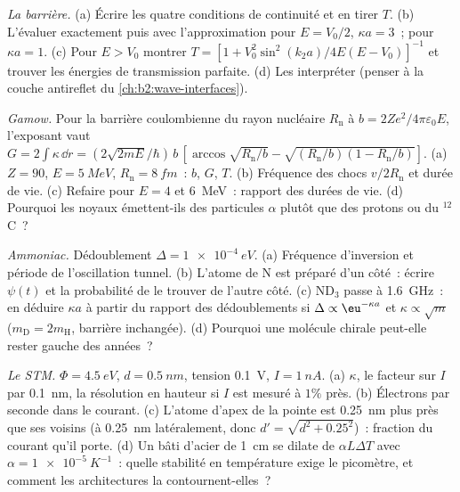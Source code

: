 \begin{exercise}[$\star\star$]\label{exo:b2:potential-wells-tunneling:8}
\emph{La barrière.} (a) Écrire les quatre conditions de continuité et en
tirer $T$. (b) L'évaluer exactement puis avec l'approximation pour $E =
V_0/2$, $\kappa a = 3$~; pour $\kappa a = 1$. (c) Pour $E > V_0$ montrer $T = [1 +
V_0^2\sin^2(k_2a)/4E(E - V_0)]^{-1}$ et trouver les énergies de transmission
parfaite. (d) Les interpréter (penser à la couche antireflet du
\cref{ch:b2:wave-interfaces}).
\end{exercise}

\begin{exercise}[$\star\star$]\label{exo:b2:potential-wells-tunneling:9}
\emph{Gamow.} Pour la barrière coulombienne du rayon nucléaire $R_{\text{n}}$
à $b = 2Ze^2/4\pi\varepsilon_0E$, l'exposant vaut $G = 2\int\kappa\,\dd r =
(2\sqrt{2mE}/\hbar)\,b\,[\arccos\sqrt{R_{\text{n}}/b} - \sqrt{(R_{\text{n}}/b)(1 -
R_{\text{n}}/b)}]$. (a) $Z = 90$, $E = \qty{5}{MeV}$, $R_{\text{n}} = \qty{8}{fm}$~:
$b$, $G$, $T$. (b) Fréquence des chocs $v/2R_{\text{n}}$ et durée de vie. (c)
Refaire pour $E = 4$ et \qty{6}{MeV}~: rapport des durées de vie. (d) Pourquoi les
noyaux émettent-ils des particules $\alpha$ plutôt que des protons ou du $^{12}$C~?
\end{exercise}

\begin{exercise}[$\star\star\star$]\label{exo:b2:potential-wells-tunneling:10}
\emph{Ammoniac.} Dédoublement $\Delta = \qty{1e-4}{eV}$. (a) Fréquence d'inversion
et période de l'oscillation tunnel. (b) L'atome de N est
préparé d'un côté~: écrire $\psi(t)$ et la probabilité de le trouver
de l'autre côté. (c) ND$_3$ passe à \qty{1.6}{GHz}~: en déduire $\kappa a$
à partir du rapport des dédoublements si $\Delta \propto \eu^{-\kappa a}$ et $\kappa
\propto\sqrt m$ ($m_{\text{D}} = 2m_{\text{H}}$, barrière inchangée). (d) Pourquoi une
molécule chirale peut-elle rester gauche des années~?
\end{exercise}

\begin{exercise}[$\star\star\star$]\label{exo:b2:potential-wells-tunneling:11}
\emph{Le STM.} $\Phi = \qty{4.5}{eV}$, $d = \qty{0.5}{nm}$, tension \qty{0.1}{V},
$I = \qty{1}{nA}$. (a) $\kappa$, le facteur sur $I$ par \qty{0.1}{nm}, la
résolution en hauteur si $I$ est mesuré à $1\%$ près. (b) Électrons par seconde
dans le courant. (c) L'atome d'apex de la pointe est \qty{0.25}{nm} plus près que ses
voisins (à \qty{0.25}{nm} latéralement, donc $d' = \sqrt{d^2 + 0.25^2}$)~:
fraction du courant qu'il porte. (d) Un bâti d'acier de \qty{1}{cm} se dilate
de $\alpha L\Delta T$ avec $\alpha = \qty{1e-5}{K^{-1}}$~: quelle stabilité en température
exige le picomètre, et comment les architectures la contournent-elles~?
\end{exercise}


